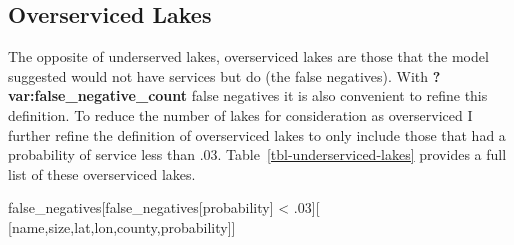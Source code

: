 \documentclass[
]{article}
\newenvironment{Shaded}{\begin{snugshade}}{\end{snugshade}}
\newcommand{\FloatTok}[1]{\textcolor[rgb]{0.68,0.00,0.00}{#1}}
\newcommand{\NormalTok}[1]{\textcolor[rgb]{0.00,0.23,0.31}{#1}}
\newcommand{\OperatorTok}[1]{\textcolor[rgb]{0.37,0.37,0.37}{#1}}
\newcommand{\StringTok}[1]{\textcolor[rgb]{0.13,0.47,0.30}{#1}}
\begin{document}
\subsection{Overserviced Lakes}\label{overserviced-lakes}

The opposite of underserved lakes, overserviced lakes are those that the
model suggested would not have services but do (the false negatives).
With \textbf{?var:false\_negative\_count} false negatives it is also
convenient to refine this definition. To reduce the number of lakes for
consideration as overserviced I further refine the definition of
overserviced lakes to only include those that had a probability of
service less than .03. Table~\ref{tbl-underserviced-lakes} provides a
full list of these overserviced lakes.

\begin{Shaded}
\begin{Highlighting}[]
\NormalTok{false\_negatives[false\_negatives[}\StringTok{\textquotesingle{}probability\textquotesingle{}}\NormalTok{] }\OperatorTok{\textless{}} \FloatTok{.03}\NormalTok{][}
\NormalTok{    [}\StringTok{\textquotesingle{}name\textquotesingle{}}\NormalTok{,}\StringTok{\textquotesingle{}size\textquotesingle{}}\NormalTok{,}\StringTok{\textquotesingle{}lat\textquotesingle{}}\NormalTok{,}\StringTok{\textquotesingle{}lon\textquotesingle{}}\NormalTok{,}\StringTok{\textquotesingle{}county\textquotesingle{}}\NormalTok{,}\StringTok{\textquotesingle{}probability\textquotesingle{}}\NormalTok{]]}
\end{Highlighting}
\end{Shaded}
\end{document}

